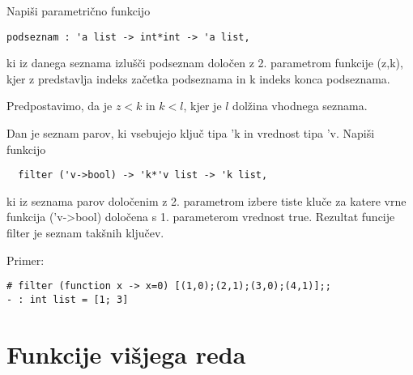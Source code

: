 \begin{ex}
Napi\v si parametri\v cno funkcijo 

\begin{lstlisting}
podseznam : 'a list -> int*int -> 'a list, 
\end{lstlisting}

ki iz danega seznama izlu\v s\v ci podseznam dolo\v cen z 2. parametrom funkcije (z,k), 
kjer z predstavlja indeks za\v cetka podseznama in k indeks konca podseznama. 

Predpostavimo, da je $z<k$ in $k<l$, kjer je $l$ dol\v zina vhodnega seznama. 

\end{ex} 
\begin{ex}
  Dan je seznam parov, ki vsebujejo klju\v c tipa 'k in vrednost tipa
  'v. Napi\v si funkcijo
\begin{lstlisting}
  filter ('v->bool) -> 'k*'v list -> 'k list,
\end{lstlisting}
  ki iz seznama parov dolo\v cenim z 2. parametrom izbere tiste klu\v
  ce za katere vrne funkcija ('v->bool) dolo\v cena s 1. parameterom
  vrednost true. Rezultat funcije filter je seznam tak\v snih klju\v
  cev.

\noindent\/Primer:
\begin{lstlisting}
# filter (function x -> x=0) [(1,0);(2,1);(3,0);(4,1)];; 
- : int list = [1; 3] 

\end{lstlisting}

\end{ex} 

\section{Funkcije vi\v sjega reda}


